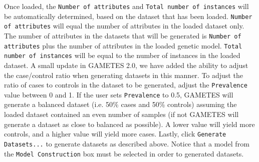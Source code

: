 \documentclass{report}
\begin{document}
Once loaded, the \texttt{Number of attributes} and \texttt{Total number of instances} will be automatically determined, based on the dataset that has been loaded.  \texttt{Number of attributes} will equal the number of attributes in the loaded dataset only.  The number of attributes in the datasets that will be generated is \texttt{Number of attributes} plus the number of attributes in the loaded genetic model.  \texttt{Total number of instances} will be equal to the number of instances in the loaded dataset.  A small update in GAMETES 2.0, we have added the ability to adjust the case/control ratio when generating datasets in this manner.  To adjust the ratio of cases to controls in the dataset to be generated, adjust the \texttt{Prevalence} value between 0 and 1.  If the user sets \texttt{Prevalence} to 0.5, GAMETES will generate a balanced dataset (i.e. 50\% cases and 50\% controls) assuming the loaded dataset contained an even number of samples (if not GAMETES will generate a dataset as close to balanced as possible). A lower value will yield more controls, and a higher value will yield more cases.  Lastly, click \texttt{Generate Datasets...} to generate datasets as described above.  Notice that a model from the \texttt{Model Construction} box must be selected in order to generated datasets.
\end{document}
